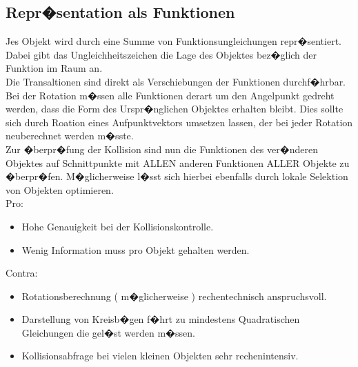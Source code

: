 \subsection{Repr�sentation als Funktionen}
Jes Objekt wird durch eine Summe von Funktionsungleichungen repr�sentiert. Dabei gibt das Ungleichheitszeichen die Lage des Objektes bez�glich der Funktion im Raum an. \\
Die Transaltionen sind direkt als Verschiebungen der Funktionen durchf�hrbar. Bei der Rotation m�ssen alle Funktionen derart um den Angelpunkt gedreht werden, dass die Form des Urspr�nglichen Objektes erhalten bleibt. Dies sollte sich durch Roation eines Aufpunktvektors umsetzen lassen, der bei jeder Rotation neuberechnet werden m�sste.\\
Zur �berpr�fung der Kollision sind nun die Funktionen des ver�nderen Objektes auf Schnittpunkte mit ALLEN anderen Funktionen ALLER Objekte zu �berpr�fen. M�glicherweise l�sst sich hierbei ebenfalls durch lokale Selektion von Objekten optimieren.\\
Pro:
\begin{itemize}
\item Hohe Genauigkeit bei der Kollisionskontrolle.
\item Wenig Information muss pro Objekt gehalten werden.
\end{itemize}
Contra:
\begin{itemize}
\item Rotationsberechnung ( m�glicherweise ) rechentechnisch anspruchsvoll.
\item Darstellung von Kreisb�gen f�hrt zu mindestens Quadratischen Gleichungen die gel�st werden m�ssen.
\item Kollisionsabfrage bei vielen kleinen Objekten sehr rechenintensiv.
\end{itemize}
